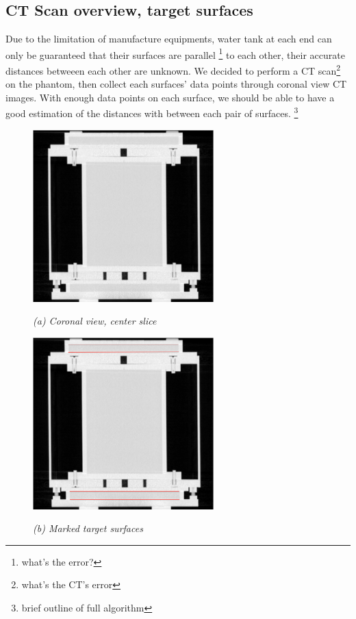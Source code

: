 
\subsection{CT Scan overview, target surfaces}
Due to the limitation of manufacture equipments, water tank at each end can only be guaranteed that their
surfaces are parallel \footnote{what's the error?} to each other, their accurate distances betweeen each other
are unknown. We decided to perform a CT scan\footnote{what's the CT's error} on the phantom, then collect each
surfaces' data points through coronal view CT images. With enough data points on each surface, we should be
able to have a good estimation of the distances with between each pair of surfaces. \footnote{brief outline of full algorithm}

\begin{figure}[htb]
  \begin{minipage}[t]{2.75in}
    \centering
    \centerline{\mbox{\includegraphics[width=2.75in]{data_extraction/images/targets/ct_coronal_mid_slice.eps}}}
    \centerline{\emph{(a) Coronal view, center slice}}
  \end{minipage}\medskip
  \begin{minipage}[t]{2.75in}
    \centering
    \centerline{\mbox{\includegraphics[width=2.75in]{data_extraction/images/targets/ct_coronal_mid_slice_marked_surface.eps}}}
    \centerline{\emph{(b) Marked target surfaces}}
  \end{minipage}
\end{figure}

